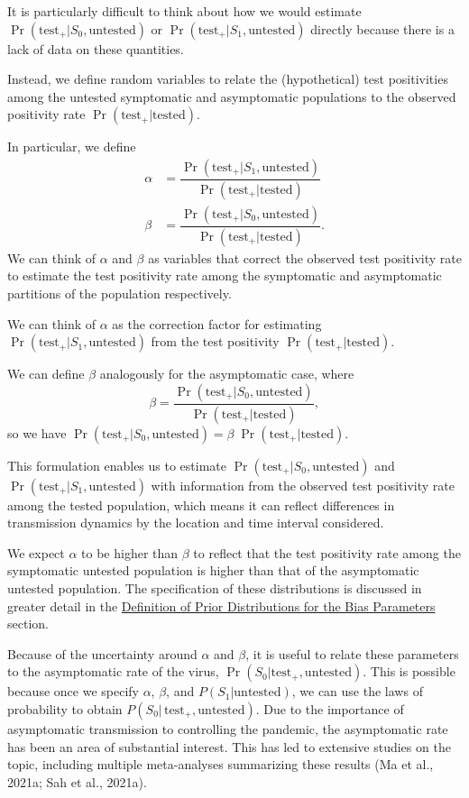 \documentclass[12pt,twoside]{smiththesis}
\begin{document}
It is particularly difficult to think about how we would estimate \(\Pr(\text{test}_+ | S_0,\text{untested})\) or \(\Pr(\text{test}_+ | S_1,\text{untested})\) directly because there is a lack of data on these quantities.

Instead, we define random variables to relate the (hypothetical) test positivities among the untested symptomatic and asymptomatic populations to the observed positivity rate \(\Pr(\text{test}_+|\text{tested})\).

In particular, we define
\begin{align*}
\alpha &= \dfrac{\Pr(\text{test}_+  |S_1, \text{untested})}{\Pr(\text{test}_+ | \text{tested})}\\
\beta  &= \dfrac{\Pr(\text{test}_+ |S_0, \text{untested})}{\Pr(\text{test}_+ | \text{tested})}.
\end{align*}
We can think of \(\alpha\) and \(\beta\) as variables that correct the observed test positivity rate to estimate the test positivity rate among the symptomatic and asymptomatic partitions of the population respectively.

We can think of \(\alpha\) as the correction factor for estimating \(\Pr(\text{test}_+|S_1,\text{untested})\) from the test positivity \(\Pr(\text{test}_+ |\text{tested})\).

We can define \(\beta\) analogously for the asymptomatic case, where
\[\beta =  \dfrac{\Pr(\text{test}_+ |S_0, \text{untested})}{\Pr(\text{test}_+ | \text{tested})},\]
so we have \(\Pr(\text{test}_+ |S_0, \text{untested}) = \beta \; \Pr(\text{test}_+ | \text{tested})\).

This formulation enables us to estimate \(\Pr(\text{test}_+ |S_0, \text{untested})\) and \(\Pr(\text{test}_+ |S_1, \text{untested})\) with information from the observed test positivity rate among the tested population, which means it can reflect differences in transmission dynamics by the location and time interval considered.

We expect \(\alpha\) to be higher than \(\beta\) to reflect that the test positivity rate among the symptomatic untested population is higher than that of the asymptomatic untested population. The specification of these distributions is discussed in greater detail in the \protect\hyperlink{defpriors}{Definition of Prior Distributions for the Bias Parameters} section.

Because of the uncertainty around \(\alpha\) and \(\beta\), it is useful to relate these parameters to the asymptomatic rate of the virus, \(\Pr(S_0|\text{test}_+, \text{untested})\). This is possible because once we specify \(\alpha\), \(\beta\), and \(P(S_1|\text{untested})\), we can use the laws of probability to obtain \(P(S_0|\,\text{test}_+,\text{untested})\). Due to the importance of asymptomatic transmission to controlling the pandemic, the asymptomatic rate has been an area of substantial interest. This has led to extensive studies on the topic, including multiple meta-analyses summarizing these results (Ma et al., 2021a; Sah et al., 2021a).
\end{document}
